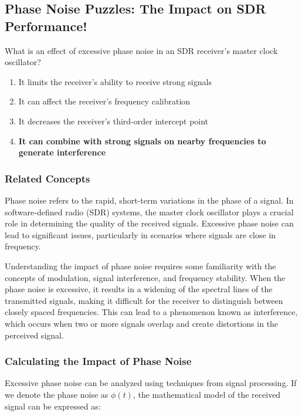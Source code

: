 \subsection{Phase Noise Puzzles: The Impact on SDR Performance!}

\begin{tcolorbox}[colback=gray!10, colframe=black, title=E4C01]  
What is an effect of excessive phase noise in an SDR receiver’s master clock oscillator?  
\begin{enumerate}[label=\Alph*.]
    \item It limits the receiver’s ability to receive strong signals
    \item It can affect the receiver’s frequency calibration
    \item It decreases the receiver’s third-order intercept point
    \item \textbf{It can combine with strong signals on nearby frequencies to generate interference}
\end{enumerate} \end{tcolorbox}

\subsubsection{Related Concepts}

Phase noise refers to the rapid, short-term variations in the phase of a signal. In software-defined radio (SDR) systems, the master clock oscillator plays a crucial role in determining the quality of the received signals. Excessive phase noise can lead to significant issues, particularly in scenarios where signals are close in frequency.

Understanding the impact of phase noise requires some familiarity with the concepts of modulation, signal interference, and frequency stability. When the phase noise is excessive, it results in a widening of the spectral lines of the transmitted signals, making it difficult for the receiver to distinguish between closely spaced frequencies. This can lead to a phenomenon known as interference, which occurs when two or more signals overlap and create distortions in the perceived signal.

\subsubsection{Calculating the Impact of Phase Noise}

Excessive phase noise can be analyzed using techniques from signal processing. If we denote the phase noise as \( \phi(t) \), the mathematical model of the received signal can be expressed as:

